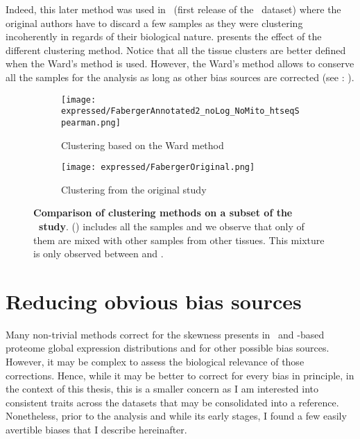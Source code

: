 Indeed, this later method was used in~
(first release of the \uhlen\ dataset) where
the original authors have to discard a few samples as they were clustering
incoherently in regards of their biological nature.
 presents the effect of the different clustering
method.
Notice that all the tissue clusters are better defined when the Ward's
method is used.
However, the Ward's method allows to conserve all the samples for the analysis
as long as other bias sources are corrected (see : ).
\begin{figure}[!htpb]
    \centering
       \begin{subfigure}[hp]{0.70\textwidth}
       \centering \texttt{[image: expressed/FabergerAnnotated2\_noLog\_NoMito\_htseqSpearman.png]}
    \caption{Clustering based on the Ward method}\label{fig:FabergerRedone}
   \end{subfigure}

     \begin{subfigure}[hp]{0.70\textwidth}
      \centering \texttt{[image: expressed/FabergerOriginal.png]}
      \caption{Clustering from the original study
      {\footnotesize {}}}\label{fig:fabergerOriginal}
       \end{subfigure}
    \caption[Comparison of clustering methods on a subset of the \uhlen\ study]{%
    \textbf{Comparison of clustering methods on a subset of the \uhlen\ study}.
    () includes all the samples and
    we observe that only of them are mixed with other samples from other tissues.
    This mixture is only observed between   and .
 }\label{fig:versusFaberger}
\end{figure}

\section{Reducing obvious bias sources}\label{sec:bias_sources}

Many non-trivial methods correct for the skewness presents in
\Rnaseq\ and \ms-based proteome global expression distributions
and for other possible bias sources.
However, it may be complex to assess the biological relevance of those corrections.
Hence, while it may be better to correct for every bias in principle,
in the context of this thesis, this is a smaller concern as I am interested into
consistent traits across the datasets that may be consolidated into a reference.
Nonetheless, prior to the analysis and while its early stages,
I found a few easily avertible biases that I describe hereinafter.

